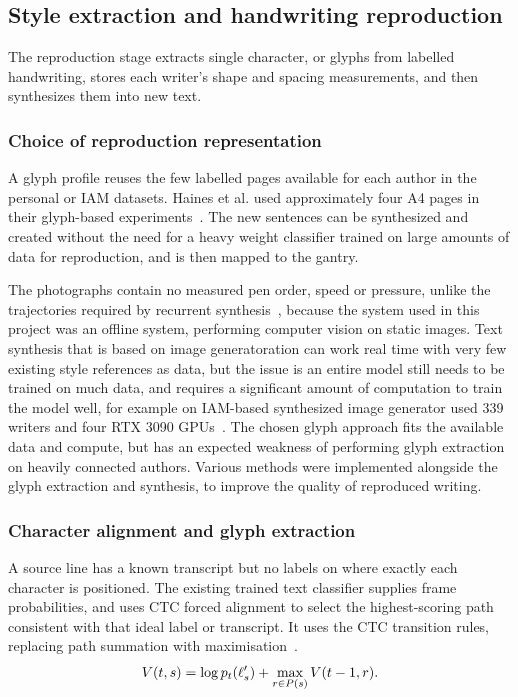 \subsection{Style extraction and handwriting reproduction}
\label{sec:des-reproduction}
The reproduction stage extracts single character, or glyphs from labelled handwriting, stores each writer's shape and spacing measurements, and then synthesizes them into new text.

\subsubsection{Choice of reproduction representation}
A glyph profile reuses the few labelled pages available for each author in the personal or IAM datasets. Haines et al. used approximately four A4 pages in their glyph-based experiments~\cite[p.~4]{haines2016}. The new sentences can be synthesized and created without the need for a heavy weight classifier trained on large amounts of data for reproduction, and is then mapped to the gantry.

The photographs contain no measured pen order, speed or pressure, unlike the trajectories required by recurrent synthesis~\cite[p.~18]{graves2013}, because the system used in this project was an offline system, performing computer vision on static images. Text synthesis that is based on image generatoration can work real time with very few existing style references as data, but the issue is an entire model still needs to be trained on much data, and requires a significant amount of computation to train the model well, for example on IAM-based synthesized image generator used 339 writers and four RTX 3090 GPUs~\cite[p.~9]{dai2024}. The chosen glyph approach fits the available data and compute, but has an expected weakness of performing glyph extraction on heavily connected authors. Various methods were implemented alongside the glyph extraction and synthesis, to improve the quality of reproduced writing.

\subsubsection{Character alignment and glyph extraction}
\label{sec:des-alignment}
A source line has a known transcript but no labels on where exactly each character is positioned. The existing trained text classifier supplies frame probabilities, and uses CTC forced alignment to select the highest-scoring path consistent with that ideal label or transcript. It uses the CTC transition rules, replacing path summation with maximisation~\cite[pp.~4--5]{graves2006}.
\begin{equation}
V(t,s)=\log p_t(\ell'_s)+\max_{r\in P(s)}V(t-1,r).
\label{eq:des-viterbi}
\end{equation}

